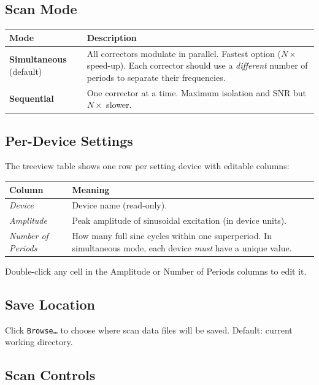 \documentclass[11pt,a4paper,twoside]{report}
\newcommand{\btn}[1]{\colorbox{accent!12}{\texttt{\small #1}}}
\newcommand{\field}[1]{\textit{#1}}
\begin{document}
\subsection{Scan Mode}

\begin{tabularx}{\textwidth}{lX}
  \toprule
  \textbf{Mode} & \textbf{Description} \\
  \midrule
  \textbf{Simultaneous} (default) & All correctors modulate in parallel. Fastest option ($N\times$ speed-up). Each corrector should use a \emph{different} number of periods to separate their frequencies. \\
  \textbf{Sequential} & One corrector at a time. Maximum isolation and SNR but $N\times$ slower. \\
  \bottomrule
\end{tabularx}

\subsection{Per-Device Settings}

The treeview table shows one row per setting device with editable columns:

\begin{tabularx}{\textwidth}{lX}
  \toprule
  \textbf{Column} & \textbf{Meaning} \\
  \midrule
  \field{Device}            & Device name (read-only). \\
  \field{Amplitude}         & Peak amplitude of sinusoidal excitation (in device units). \\
  \field{Number of Periods} & How many full sine cycles within one superperiod. In simultaneous mode, each device \emph{must} have a unique value. \\
  \bottomrule
\end{tabularx}

Double-click any cell in the Amplitude or Number of Periods columns to edit it.

\subsection{Save Location}

Click \btn{Browse\ldots} to choose where scan data files will be saved. Default: current working directory.

\subsection{Scan Controls}
\end{document}
